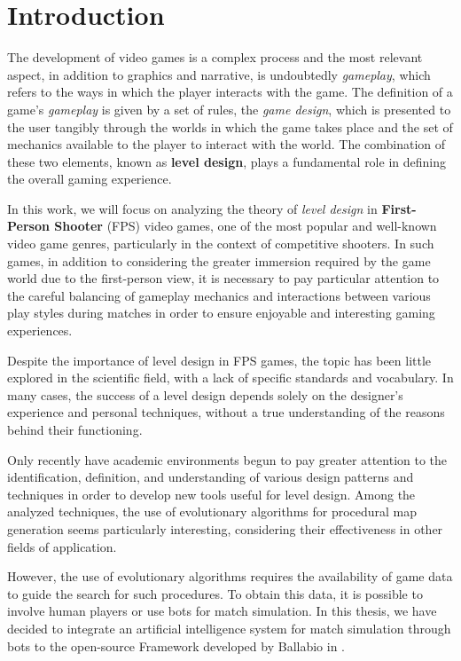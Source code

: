 \chapter{Introduction}

The development of video games is a complex process and the most relevant aspect, in addition to graphics and narrative, is undoubtedly \textit{gameplay}, which refers to the ways in which the player interacts with the game. The definition of a game's \textit{gameplay} is given by a set of rules, the \textit{game design}, which is presented to the user tangibly through the worlds in which the game takes place and the set of mechanics available to the player to interact with the world. The combination of these two elements, known as \textbf{level design}, plays a fundamental role in defining the overall gaming experience.

In this work, we will focus on analyzing the theory of \textit{level design} in \textbf{First-Person Shooter} (FPS) video games, one of the most popular and well-known video game genres, particularly in the context of competitive shooters. In such games, in addition to considering the greater immersion required by the game world due to the first-person view, it is necessary to pay particular attention to the careful balancing of gameplay mechanics and interactions between various play styles during matches in order to ensure enjoyable and interesting gaming experiences.

Despite the importance of level design in FPS games, the topic has been little explored in the scientific field, with a lack of specific standards and vocabulary. In many cases, the success of a level design depends solely on the designer's experience and personal techniques, without a true understanding of the reasons behind their functioning.

Only recently have academic environments begun to pay greater attention to the identification, definition, and understanding of various design patterns and techniques in order to develop new tools useful for level design. Among the analyzed techniques, the use of evolutionary algorithms for procedural map generation seems particularly interesting, considering their effectiveness in other fields of application.

However, the use of evolutionary algorithms requires the availability of game data to guide the search for such procedures. To obtain this data, it is possible to involve human players or use bots for match simulation. In this thesis, we have decided to integrate an artificial intelligence system for match simulation through bots to the open-source Framework developed by Ballabio in \cite{ballabio_framework}. 

